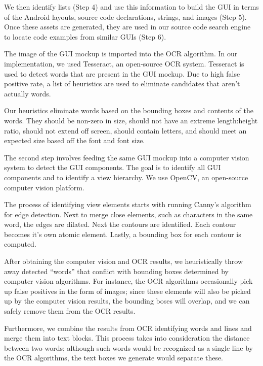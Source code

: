 \documentclass[10pt,twocolumn]{article}
\begin{document}
We then identify lists (Step 4) and use this information to build the GUI in terms of the Android layouts, source code declarations, strings, and images (Step 5). Once these assets are generated, they are used in our source code search engine to locate code examples from similar GUIs (Step 6).

The image of the GUI mockup is imported into the OCR algorithm. In our implementation, we used Tesseract, an open-source OCR system. Tesseract is used to detect words that are present in the GUI mockup. Due to high false positive rate, a list of heuristics are used to eliminate candidates that aren’t actually words.

Our heuristics eliminate words based on the bounding boxes and contents of the words. They should be non-zero in size, should not have an extreme length:height ratio, should not extend off screen, should contain letters, and should meet an expected size based off the font and font size.

The second step involves feeding the same GUI mockup into a computer vision system to detect the GUI components. The goal is to identify all GUI components and to identify a view hierarchy. We use OpenCV, an open-source computer vision platform.

The process of identifying view elements starts with running Canny’s algorithm for edge detection. Next to merge close elements, such as characters in the same word, the edges are dilated. Next the contours are identified. Each contour becomes it’s own atomic element. Lastly, a bounding box for each contour is computed.

After obtaining the computer vision and OCR results, we heuristically throw away
detected ``words'' that conflict with bounding boxes determined by computer
vision algorithms.  For instance, the OCR algorithms occasionally pick up false
positives in the form of images;  since these elements will also be picked up by
the computer vision results, the bounding boses will overlap, and we can safely
remove them from the OCR results.

Furthermore, we combine the results from OCR identifying words and lines and
merge them into text blocks.  This process takes into consideration the distance
between two words; although such words would be recognized as a single line by
the OCR algorithms, the text boxes we generate would separate these.
\end{document}
